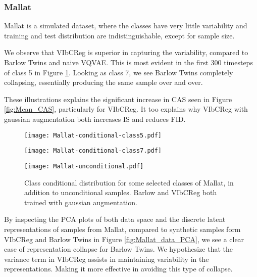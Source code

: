 \documentclass[../../thesis.tex]{subfiles}
\begin{document}
\subsubsection{Mallat}
Mallat is a simulated dataset, where the classes have very little variability and training and test distribution are indistinguishable, except for sample size. \newline

We observe that VIbCReg is superior in capturing the variability, compared to Barlow Twins and naive VQVAE. This is most evident in the first 300 timesteps of class 5 in Figure \ref{fig:Gaussian_Mallat}. Looking as class 7, we see Barlow Twins completely collapsing, essentially producing the same sample over and over. \newline

These illustrations explains the significant increase in CAS seen in Figure \ref{fig:Mean_CAS}, particularly for VIbCReg. It too explains why VIbCReg with gaussian augmentation both increases IS and reduces FID. \newline

\begin{figure}[H]
    \centering
    \begin{minipage}[b]{0.32\textwidth}
        \centering
        \texttt{[image: Mallat-conditional-class5.pdf]}
    \end{minipage}
    \begin{minipage}[b]{0.32\textwidth}
        \centering
        \texttt{[image: Mallat-conditional-class7.pdf]}
    \end{minipage}
    \begin{minipage}[b]{0.32\textwidth}
        \centering
        \texttt{[image: Mallat-unconditional.pdf]}
    \end{minipage}
    \caption{Class conditional distribution for some selected classes of Mallat, in addition to unconditional samples. Barlow and VIbCReg both trained with gaussian augmentation.}
    \label{fig:Gaussian_Mallat}
\end{figure}

By inspecting the PCA plots of both data space and the discrete latent representations of samples from Mallat, compared to synthetic samples form VIbCReg and Barlow Twins in Figure \ref{fig:Mallat_data_PCA}, we see a clear case of representation collapse for Barlow Twins. We hypothesize that the variance term in VIbCReg assists in maintaining variability in the representations. Making it more effective in avoiding this type of collapse. 
\end{document}
